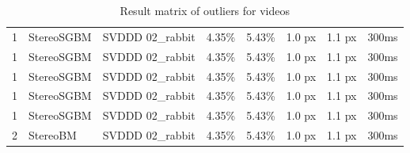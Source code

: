 \begin{landscape}
\begin{table}[h!]
\begin{tabular}{cll|rrrrr}
    1 & StereoSGBM & SVDDD 02\_rabbit & 4.35\% & \cellcolor{green!60}5.43\% & 1.0 px & 1.1 px & 300ms \\
    1 & StereoSGBM & SVDDD 02\_rabbit & 4.35\% & \cellcolor{green!60}5.43\% & 1.0 px & 1.1 px & 300ms \\
    1 & StereoSGBM & SVDDD 02\_rabbit & 4.35\% & \cellcolor{green!60}5.43\% & 1.0 px & 1.1 px & 300ms \\
    1 & StereoSGBM & SVDDD 02\_rabbit & 4.35\% & \cellcolor{green!60}5.43\% & 1.0 px & 1.1 px & 300ms \\
    1 & StereoSGBM & SVDDD 02\_rabbit & 4.35\% & \cellcolor{green!60}5.43\% & 1.0 px & 1.1 px & 300ms \\
    2 & StereoBM & SVDDD 02\_rabbit & 4.35\% & 5.43\% & 1.0 px & \cellcolor{red!60}1.1 px & 300ms \\ \hline
  \end{tabular}
  \caption{Result matrix of outliers for videos}
  \label{tab:result-videos-out}
  \end{table}
\end{landscape}



